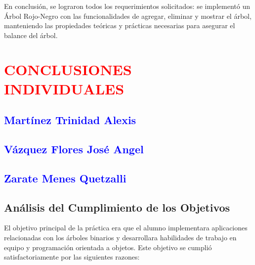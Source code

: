 \documentclass[12pt]{article}
\begin{document}
En conclusión, se lograron todos los requerimientos solicitados: se implementó un Árbol Rojo-Negro con las funcionalidades de agregar, eliminar y mostrar el árbol, manteniendo las propiedades teóricas y prácticas necesarias para asegurar el balance del árbol.

\subsection*{\textcolor{blue}{  }}

\subsection*{\textcolor{blue}{  }}





\section*{\textcolor{red}{\textbf{CONCLUSIONES INDIVIDUALES}}}

\subsection*{\textcolor{blue}{Martínez Trinidad Alexis}}



\subsection*{\textcolor{blue}{Vázquez Flores José Angel}}



\subsection*{\textcolor{blue}{Zarate Menes Quetzalli}}
\subsection*{Análisis del Cumplimiento de los Objetivos}

El objetivo principal de la práctica era que el alumno implementara aplicaciones relacionadas con los árboles binarios y desarrollara habilidades de trabajo en equipo y programación orientada a objetos. Este objetivo se cumplió satisfactoriamente por las siguientes razones:
\end{document}
